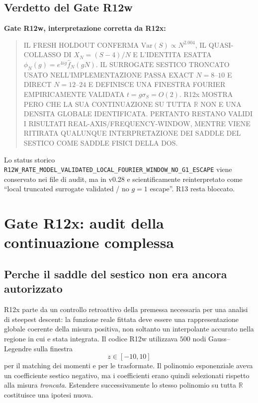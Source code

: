 \documentclass[11pt,a4paper]{article}
\newcommand{\status}[1]{\textsf{#1}}
\begin{document}
\subsection{Verdetto del Gate R12w}

\textbf{Gate R12w, interpretazione corretta da R12x:}
\begin{quote}
\status{IL FRESH HOLDOUT CONFERMA $\mathrm{Var}(S)\propto N^{2.004}$, IL QUASI-COLLASSO DI $X_N=(S-4)/N$ E L'IDENTITA ESATTA $\phi_N(g)=e^{4ig}\widehat f_N(gN)$. IL SURROGATE SESTICO TRONCATO USATO NELL'IMPLEMENTAZIONE PASSA EXACT $N=8$--$10$ E DIRECT $N=12$--$24$ E DEFINISCE UNA FINESTRA FOURIER EMPIRICAMENTE VALIDATA $t=g\sigma_S=O(2)$. R12x MOSTRA PERO CHE LA SUA CONTINUAZIONE SU TUTTA $\mathbb R$ NON E UNA DENSITA GLOBALE IDENTIFICATA. PERTANTO RESTANO VALIDI I RISULTATI REAL-AXIS/FREQUENCY-WINDOW, MENTRE VIENE RITIRATA QUALUNQUE INTERPRETAZIONE DEI SADDLE DEL SESTICO COME SADDLE FISICI DELLA DOS.}
\end{quote}

Lo status storico \texttt{R12W\_RATE\_MODEL\_VALIDATED\_LOCAL\_FOURIER\_WINDOW\_NO\_G1\_ESCAPE} viene conservato nei file di audit, ma in v0.28 e scientificamente reinterpretato come ``local truncated surrogate validated / no $g=1$ escape''. R13 resta bloccato.


\section{Gate R12x: audit della continuazione complessa}

\subsection{Perche il saddle del sestico non era ancora autorizzato}

R12x parte da un controllo retroattivo della premessa necessaria per una analisi di steepest descent: la funzione reale fittata deve essere una rappresentazione globale coerente della misura positiva, non soltanto un interpolante accurato nella regione in cui e stata integrata. Il codice R12w utilizzava $500$ nodi Gauss--Legendre sulla finestra
\begin{equation}
 z\in[-10,10]
\end{equation}
per il matching dei momenti e per le trasformate. Il polinomio esponenziale aveva un coefficiente sestico negativo, ma i coefficienti erano quindi selezionati rispetto alla misura \emph{troncata}. Estendere successivamente lo stesso polinomio su tutta $\mathbb R$ costituisce una ipotesi nuova.
\end{document}
